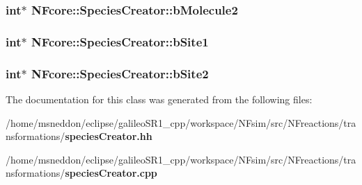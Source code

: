 \subsubsection{\setlength{\rightskip}{0pt plus 5cm}int$\ast$ {\bf NFcore::SpeciesCreator::bMolecule2}\hspace{0.3cm}{\tt  [protected]}}\label{classNFcore_1_1SpeciesCreator_8d4caa643ae21910fc49577331b6e9aa}


\subsubsection{\setlength{\rightskip}{0pt plus 5cm}int$\ast$ {\bf NFcore::SpeciesCreator::bSite1}\hspace{0.3cm}{\tt  [protected]}}\label{classNFcore_1_1SpeciesCreator_5c07bfe05a98d21564079015559defc0}


\subsubsection{\setlength{\rightskip}{0pt plus 5cm}int$\ast$ {\bf NFcore::SpeciesCreator::bSite2}\hspace{0.3cm}{\tt  [protected]}}\label{classNFcore_1_1SpeciesCreator_709c3005ce881579df83cb7c3e0c45aa}




The documentation for this class was generated from the following files:\begin{CompactItemize}
\item 
/home/msneddon/eclipse/galileoSR1\_\-cpp/workspace/NFsim/src/NFreactions/transformations/{\bf speciesCreator.hh}\item 
/home/msneddon/eclipse/galileoSR1\_\-cpp/workspace/NFsim/src/NFreactions/transformations/{\bf speciesCreator.cpp}\end{CompactItemize}
